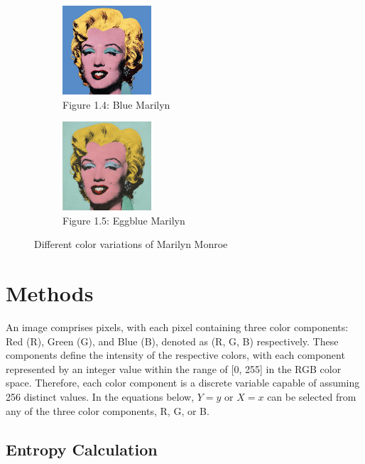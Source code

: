 \documentclass{article}
\begin{document}
\begin{figure}[ht]
  \begin{minipage}{0.6\textwidth}
    \centering
    \begin{subfigure}{0.45\textwidth}
      \centering
      \includegraphics[width=125px]{main_files/figure-latex/1_4_blue_marilyn.jpg}
      \caption{Figure 1.4: Blue Marilyn}
      \label{fig:1_4_blue_marilyn}
    \end{subfigure}
    \hfill
    \begin{subfigure}{0.45\textwidth}
      \centering
      \includegraphics[width=125px]{main_files/figure-latex/1_5_eggblue_marilyn.jpg}
      \caption{Figure 1.5: Eggblue Marilyn}
      \label{fig:1_5_eggblue_marilyn}
    \end{subfigure}
  \end{minipage}

  \caption{Different color variations of Marilyn Monroe}
  \label{fig:marilyn_variations}
\end{figure}

\hypertarget{methods}{%
\section{Methods}\label{methods}}

An image comprises pixels, with each pixel containing three color
components: Red (R), Green (G), and Blue (B), denoted as (R, G, B)
respectively. These components define the intensity of the respective
colors, with each component represented by an integer value within the
range of {[}0, 255{]} in the RGB color space. Therefore, each color
component is a discrete variable capable of assuming 256 distinct
values. In the equations below, \(Y=y\) or \(X=x\) can be selected from
any of the three color components, R, G, or B.

\hypertarget{entropy-calculation}{%
\subsection{Entropy Calculation}\label{entropy-calculation}}
\end{document}
